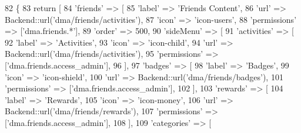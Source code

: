\begin{DoxyCode}
82     \{
83         \textcolor{keywordflow}{return} [
84             \textcolor{stringliteral}{'friends'} => [
85                 \textcolor{stringliteral}{'label'}         => \textcolor{stringliteral}{'Friends Content'},
86                 \textcolor{stringliteral}{'url'}           => Backend::url(\textcolor{stringliteral}{'dma/friends/activities'}),
87                 \textcolor{stringliteral}{'icon'}          => \textcolor{stringliteral}{'icon-users'},
88                 \textcolor{stringliteral}{'permissions'}   => [\textcolor{stringliteral}{'dma.friends.*'}],
89                 \textcolor{stringliteral}{'order'}         => 500,
90                 \textcolor{stringliteral}{'sideMenu'}  => [
91                     \textcolor{stringliteral}{'activities'}   => [
92                         \textcolor{stringliteral}{'label'}         => \textcolor{stringliteral}{'Activities'},
93                         \textcolor{stringliteral}{'icon'}          => \textcolor{stringliteral}{'icon-child'},
94                         \textcolor{stringliteral}{'url'}           => Backend::url(\textcolor{stringliteral}{'dma/friends/activities'}),
95                         \textcolor{stringliteral}{'permissions'}   => [\textcolor{stringliteral}{'dma.friends.access\_admin'}],
96                     ],  
97                     \textcolor{stringliteral}{'badges'}    => [
98                         \textcolor{stringliteral}{'label'}         => \textcolor{stringliteral}{'Badges'},
99                         \textcolor{stringliteral}{'icon'}          => \textcolor{stringliteral}{'icon-shield'},
100                         \textcolor{stringliteral}{'url'}           => Backend::url(\textcolor{stringliteral}{'dma/friends/badges'}),
101                         \textcolor{stringliteral}{'permissions'}   => [\textcolor{stringliteral}{'dma.friends.access\_admin'}],
102                     ],
103                     \textcolor{stringliteral}{'rewards'}   => [
104                         \textcolor{stringliteral}{'label'}         => \textcolor{stringliteral}{'Rewards'},
105                         \textcolor{stringliteral}{'icon'}          => \textcolor{stringliteral}{'icon-money'},
106                         \textcolor{stringliteral}{'url'}           => Backend::url(\textcolor{stringliteral}{'dma/friends/rewards'}),
107                         \textcolor{stringliteral}{'permissions'}   => [\textcolor{stringliteral}{'dma.friends.access\_admin'}],
108                     ],
109                     \textcolor{stringliteral}{'categories'} => [

\end{DoxyCode}
